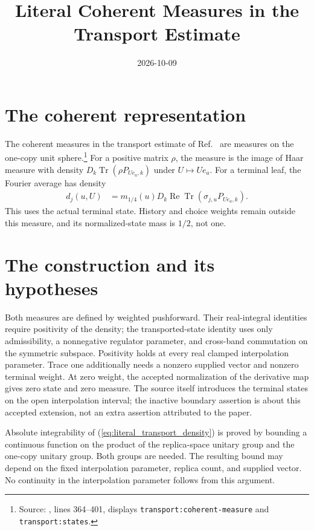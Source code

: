 \documentclass[11pt]{article}
\title{Literal Coherent Measures in the Transport Estimate}
\author{}
\date{2026-10-09}
\begin{document}
\maketitle
{}

\section{The coherent representation}

The coherent measures in the transport estimate of
Ref.~\cite[Proposition~7.4]{OpenAI2026AreaLaw} are measures on the one-copy unit
sphere.\footnote{Source: , lines 364--401, displays
\texttt{transport:coherent-measure} and \texttt{transport:states}.}
For a positive matrix $\rho$, the measure is the image of Haar measure with
density $D_k\operatorname{Tr}(\rho P_{Ue_a,k})$ under $U\mapsto Ue_a$.
For a terminal leaf, the Fourier average has density
\begin{align}
 d_j(u,U)&=m_{1/4}(u)D_k
   \operatorname{Re}\operatorname{Tr}(\sigma_{j,u}P_{Ue_a,k}).
 \label{eq:literal_transport_density}
\end{align}
This uses the actual terminal state. History and choice weights remain outside
this measure, and its normalized-state mass is $1/2$, not one.

\section{The construction and its hypotheses}

Both measures are defined by weighted pushforward. Their real-integral
identities require positivity of the density; the transported-state identity uses
only admissibility, a nonnegative regulator parameter, and cross-band commutation
on the symmetric subspace. Positivity holds at every real clamped interpolation
parameter. Trace one additionally needs a nonzero supplied vector and nonzero
terminal weight. At zero weight, the accepted normalization of the derivative
map gives zero state and zero measure. The source itself introduces the terminal
states on the open interpolation interval; the inactive boundary assertion is
about this accepted extension, not an extra assertion attributed to the paper.

Absolute integrability of (\ref{eq:literal_transport_density}) is proved by
bounding a continuous function on the product of the replica-space unitary
group and the one-copy unitary group. Both groups are needed. The resulting
bound may depend on the fixed interpolation parameter, replica count, and
supplied vector. No continuity in the interpolation parameter follows from
this argument.
\end{document}
